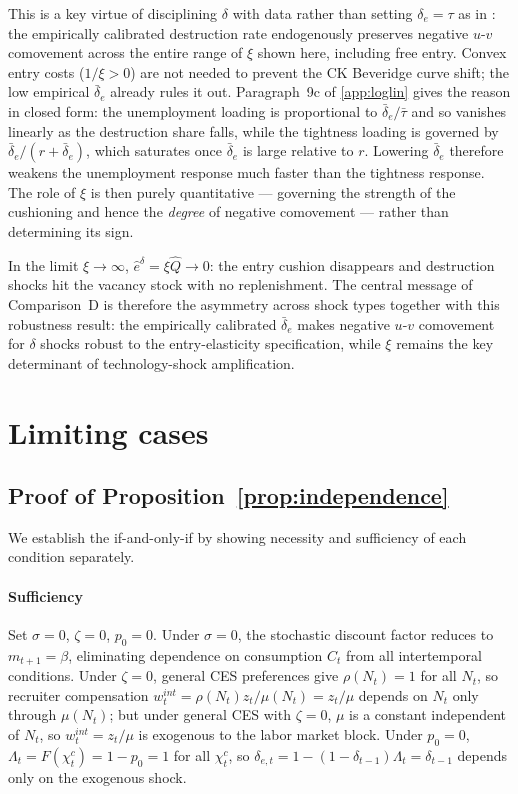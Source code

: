 \documentclass[authoryear, review, 12pt]{elsarticle}
\begin{document}
This is a key virtue of disciplining $\delta$ with data rather than
setting $\delta_e=\tau$ as in \citet{coles_2018}: the empirically
calibrated destruction rate endogenously preserves negative $u$-$v$
comovement across the entire range of $\xi$ shown here, including free
entry.  Convex entry costs ($1/\xi>0$) are not needed to
prevent the CK Beveridge curve shift; the low empirical $\bar\delta_e$
already rules it out.  Paragraph~9c of \ref{app:loglin} gives the reason in
closed form: the unemployment loading is proportional to
$\bar\delta_e/\bar\tau$ and so vanishes linearly as the destruction share
falls, while the tightness loading is governed by
$\bar\delta_e/(r+\bar\delta_e)$, which saturates once $\bar\delta_e$ is
large relative to $r$.  Lowering $\bar\delta_e$ therefore weakens the
unemployment response much faster than the tightness response.
The role of $\xi$ is then purely quantitative ---
governing the strength of the cushioning and hence the \emph{degree} of
negative comovement --- rather than determining its sign.

In the limit $\xi\to\infty$, $\hat{e}^\delta=\xi\hat{Q}\to 0$: the entry
cushion disappears and destruction shocks hit the vacancy stock with no
replenishment.  The central message of Comparison~D is therefore the
asymmetry across shock types together with this robustness result: the
empirically calibrated $\bar\delta_e$ makes negative $u$-$v$ comovement
for $\delta$ shocks robust to the entry-elasticity specification, while
$\xi$ remains the key determinant of technology-shock amplification.



\section{Limiting cases}
\label{app:limiting_cases}

\subsection*{Proof of Proposition~\ref{prop:independence}}

We establish the if-and-only-if by showing necessity 
and sufficiency of each condition separately.

\paragraph{Sufficiency}
Set $\sigma=0$, $\zeta=0$, $p_0=0$. Under $\sigma=0$, 
the stochastic discount factor reduces to 
$m_{t+1}=\beta$, eliminating dependence on 
consumption $C_t$ from all intertemporal conditions. 
Under $\zeta=0$, general CES preferences give 
$\rho(N_t)=1$ for all $N_t$, so recruiter 
compensation $w_t^{int}=\rho(N_t)z_t/\mu(N_t) = 
z_t/\mu$ depends on $N_t$ only through $\mu(N_t)$; 
but under general CES with $\zeta=0$, $\mu$ is a 
constant independent of $N_t$, so $w_t^{int}=z_t/\mu$ 
is exogenous to the labor market block. Under $p_0=0$, 
$\Lambda_t = F(\chi_t^c) = 1-p_0 = 1$ for all 
$\chi_t^c$, so $\delta_{e,t}=1-(1-\delta_{t-1})\Lambda_t 
= \delta_{t-1}$ depends only on the exogenous shock.
\end{document}
